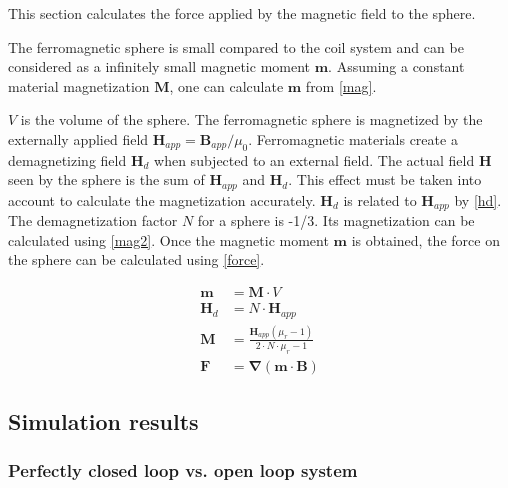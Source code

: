 \documentclass[letterpaper, 10 pt, conference]{ieeeconf}  %
\begin{document}
This section calculates the force applied by the magnetic field to the sphere.\par
The ferromagnetic sphere is small compared to the coil system and can be considered as a infinitely small magnetic moment $\mathbf{m}$. Assuming a constant material magnetization $\mathbf{M}$, one can calculate $\mathbf{m}$ from \cref{mag}.

$V$ is the volume of the sphere.
The ferromagnetic sphere is magnetized by the externally applied field $\mathbf{H}_{app}=\mathbf{B}_{app}/\mu_0$. Ferromagnetic materials create a demagnetizing field $\mathbf{H}_d$ when subjected to an external field. The actual field $\mathbf{H}$ seen by the sphere is the sum of $\mathbf{H}_{app}$ and $\mathbf{H}_d$. This effect must be taken into account to calculate the magnetization accurately. $\mathbf{H}_d$ is related to $\mathbf{H}_{app}$ by \cref{hd}. The demagnetization factor $N$ for a sphere is -1/3. Its magnetization can be calculated using \cref{mag2}.
Once the magnetic moment $\mathbf{m}$ is obtained, the force on the sphere can be calculated using \cref{force}.

\begin{align}
\mathbf{m}&=\mathbf{M}\cdot V \label{mag}\\
\mathbf{H}_d&=N\cdot \mathbf{H}_{app}\label{hd}\\
\mathbf{M}&=\frac{\mathbf{H}_{app}\left ( \mu_r-1  \right )}{2\cdot N\cdot \mu_r-1} \label{mag2}\\
\mathbf{F}&=\mathbf{\nabla}(\mathbf{m}\cdot \mathbf{B}) \label{force}
\end{align}

\subsection{Simulation results}

\subsubsection{Perfectly closed loop vs. open loop system}
\label{clol}
\end{document}
